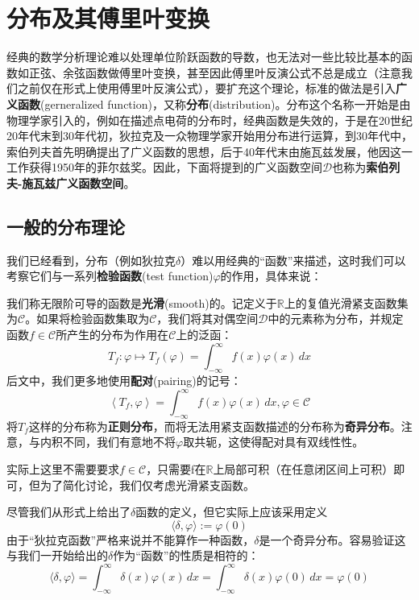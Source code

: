 \section{分布及其傅里叶变换}\label{sec:Distributions}

经典的数学分析理论难以处理单位阶跃函数的导数，也无法对一些比较比基本的函数如正弦、余弦函数做傅里叶变换，甚至因此傅里叶反演公式不总是成立（注意我们之前仅在形式上使用傅里叶反演公式），要扩充这个理论，标准的做法是引入\textbf{广义函数}(gerneralized function)，又称\textbf{分布}(distribution)。分布这个名称一开始是由物理学家引入的，例如在描述点电荷的分布时，经典函数是失效的，于是在20世纪20年代末到30年代初，狄拉克及一众物理学家开始用分布进行运算，到30年代中，索伯列夫首先明确提出了广义函数的思想，后于40年代末由施瓦兹发展，他因这一工作获得1950年的菲尔兹奖。因此，下面将提到的广义函数空间$\mathcal{D} $也称为\textbf{索伯列夫-施瓦兹广义函数空间}\cite{zorich}。

\subsection{一般的分布理论}\label{sub:general_distributions}

我们已经看到，分布（例如狄拉克$\delta$）难以用经典的“函数”来描述，这时我们可以考察它们与一系列\textbf{检验函数}(test function)$\varphi$的作用，具体来说：
\begin{definition}[分布]
    我们称无限阶可导的函数是\textbf{光滑}(smooth)的。记定义于$\mathbb{R}$上的复值光滑紧支函数集为$\mathcal{C} $。如果将检验函数集取为$\mathcal{C}$，我们将其对偶空间$\mathcal{D} $中的元素称为分布，并规定函数$f\in \mathcal{C} $所产生的分布为作用在$\mathcal{C}$上的泛函：
    $$T_f:\varphi\mapsto T_f(\varphi)=\int_{-\infty}^{\infty}f(x)\varphi(x)\,dx$$
    后文中，我们更多地使用\textbf{配对}(pairing)的记号：
    \begin{equation*}
        \left\langle T_f,\varphi\right\rangle=\int_{-\infty}^{\infty}f(x)\varphi(x)\,dx,\varphi\in\mathcal{C}
    \end{equation*}
    将$T_f$这样的分布称为\textbf{正则分布}，而将无法用紧支函数描述的分布称为\textbf{奇异分布}。注意，与内积不同，我们有意地不将$\varphi$取共轭，这使得配对具有双线性性。
\end{definition}
\begin{remark}
   实际上这里不需要要求$f\in\mathcal{C} $，只需要f在$\mathbb{R}$上局部可积（在任意闭区间上可积）即可，但为了简化讨论，我们仅考虑光滑紧支函数。 
\end{remark}
\begin{example}
    尽管我们从形式上给出了$\delta$函数的定义，但它实际上应该采用定义
\[\langle \delta,\varphi\rangle:=\varphi(0)\]
由于“狄拉克函数”严格来说并不能算作一种函数，$\delta$是一个奇异分布。容易验证这与我们一开始给出的$\delta$作为“函数”的性质是相符的：
\[\langle \delta,\varphi\rangle=\int_{-\infty}^{\infty}\delta(x)\varphi(x)\,dx=\int_{-\infty}^{\infty}\delta(x)\varphi(0)\,dx=\varphi(0)\]
\end{example}

